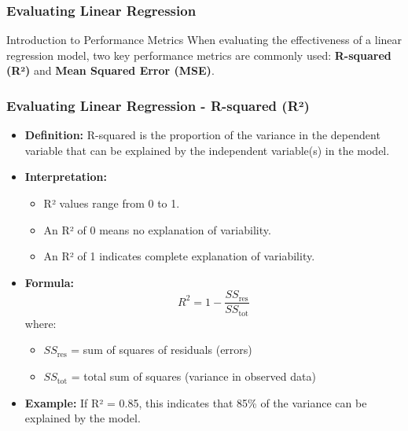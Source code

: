 \documentclass[aspectratio=169]{beamer}
\begin{document}
\begin{frame}[fragile]
    \frametitle{Evaluating Linear Regression}
    \begin{block}{Introduction to Performance Metrics}
        When evaluating the effectiveness of a linear regression model, two key performance metrics are commonly used: \textbf{R-squared (R²)} and \textbf{Mean Squared Error (MSE)}.
    \end{block}
\end{frame}

\begin{frame}[fragile]
    \frametitle{Evaluating Linear Regression - R-squared (R²)}
    \begin{itemize}
        \item \textbf{Definition:} R-squared is the proportion of the variance in the dependent variable that can be explained by the independent variable(s) in the model.
        \item \textbf{Interpretation:}
        \begin{itemize}
            \item R² values range from 0 to 1.
            \item An R² of 0 means no explanation of variability.
            \item An R² of 1 indicates complete explanation of variability.
        \end{itemize}
        \item \textbf{Formula:}
        \begin{equation}
            R^2 = 1 - \frac{SS_{\text{res}}}{SS_{\text{tot}}}
        \end{equation}
        where:
        \begin{itemize}
            \item \( SS_{\text{res}} \) = sum of squares of residuals (errors)
            \item \( SS_{\text{tot}} \) = total sum of squares (variance in observed data)
        \end{itemize}
        \item \textbf{Example:} If R² = 0.85, this indicates that 85\% of the variance can be explained by the model.
    \end{itemize}
\end{frame}
\end{document}
